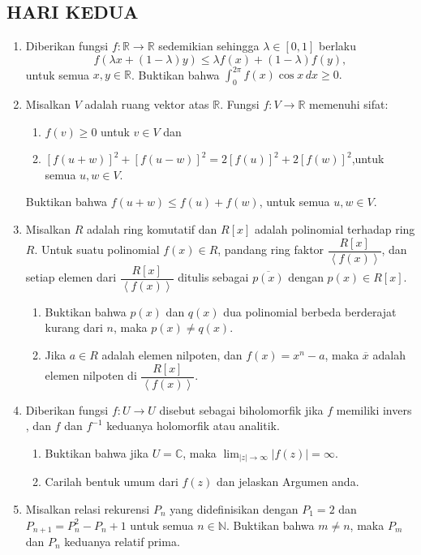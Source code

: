 \documentclass[12pt,twoside]{article}
\begin{document}
\subsection{HARI KEDUA}
\begin{enumerate}
    \item Diberikan fungsi $f:\mathbb{R}\to \mathbb{R}$ sedemikian  sehingga $\lambda\in[0,1]$ berlaku
          $$f(\lambda x+(1-\lambda)y)\leq \lambda f(x)+(1-\lambda)f(y),$$ untuk semua $x,y\in \mathbb{R}$. Buktikan bahwa
          $\displaystyle\int_{0}^{2\pi}f(x)\cos x\,dx\geq 0.$

    \item Misalkan $V$ adalah ruang vektor atas $\mathbb{R}$. Fungsi $f:V\to\mathbb{R}$ memenuhi sifat:
          \begin{enumerate}
              \item [(a)] $f(v)\geq 0$ untuk $v\in V$ dan
              \item[(b)]$\left[f(u+w)\right]^2+\left[f(u-w)\right]^2=2\left[f(u)\right]^2+2\left[f(w)\right]^2$,untuk semua $u,w\in V$.
          \end{enumerate}
          Buktikan bahwa $f(u+w)\leq f(u)+f(w)$, untuk semua $u,w\in V$.

    \item Misalkan $R$ adalah ring komutatif dan $R[x]$ adalah polinomial terhadap ring $R$. Untuk suatu polinomial $f(x)\in R$, pandang ring faktor $\dfrac{R[x]}{\left<f(x)\right>}$, dan setiap elemen dari $\dfrac{R[x]}{\left<f(x)\right>}$ ditulis sebagai $\overline{p(x)}$ dengan $p(x)\in R[x]$.
          \begin{enumerate}
              \item [(a)] Buktikan bahwa $p(x)$ dan $q(x)$ dua polinomial berbeda berderajat kurang  dari $n$, maka $p(x)\neq q(x)$.
              \item[(b)] Jika $a\in R$ adalah elemen nilpoten, dan $f(x)=x^n-a$, maka $\overline{x}$ adalah elemen nilpoten di $\dfrac{R[x]}{\left<f(x)\right>}$.
          \end{enumerate}

    \item Diberikan fungsi $f:U\to U$ disebut sebagai biholomorfik jika $f$ memiliki invers , dan $f$ dan $f^{-1}$ keduanya holomorfik atau analitik.
          \begin{enumerate}
              \item [(a)] Buktikan bahwa jika $U=\mathbb{C}$, maka
                    $\displaystyle \lim_{|z|\to \infty}|f(z)|=\infty$.
              \item[(b)] Carilah bentuk umum dari $f(z)$ dan jelaskan Argumen anda.
          \end{enumerate}

    \item Misalkan relasi rekurensi $P_n$ yang didefinisikan dengan $P_1=2$ dan $P_{n+1}=P_n^2-P_n+1$ untuk semua $n\in\mathbb{N}$. Buktikan bahwa $m\neq n$, maka $P_m$ dan $P_n$ keduanya relatif prima.
\end{enumerate}
\newpage
{}
\end{document}
